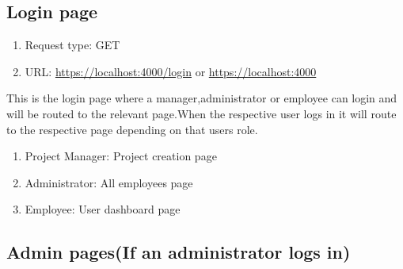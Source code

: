 \documentclass[a4paper,12pt]{article}
\begin{document}
	\subsection{Login page}
	\begin{enumerate}
		\item Request type: GET
		\item URL: \url{https://localhost:4000/login} or \url{https://localhost:4000}
	\end{enumerate}

	\begin{flushleft}
			This is the login page where a manager,administrator or employee can login and will be routed to the relevant page.When the respective user logs in it will route to the respective page depending on that users role.
			\begin{enumerate}
    		\item Project Manager: Project creation page
    		\item Administrator: All employees page
    		\item Employee: User dashboard page
    	\end{enumerate}
	\end{flushleft}

    \subsection{Admin pages(If an administrator logs in)}
\end{document}

